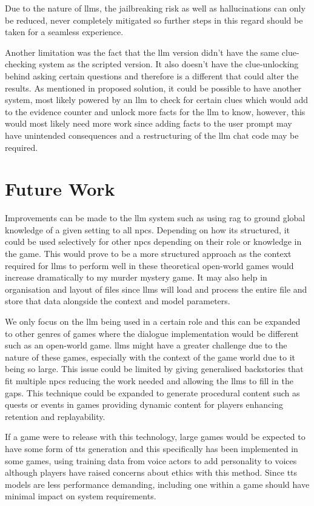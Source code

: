 \documentclass[12pt, a4paper]{report}
\begin{document}
	Due to the nature of \gls{llm}s, the jailbreaking risk as well as hallucinations can only be reduced, never completely mitigated so further steps in this regard should be taken for a seamless experience.
	
	Another limitation was the fact that the \gls{llm} version didn't have the same clue-checking system as the scripted version. It also doesn't have the clue-unlocking behind asking certain questions and therefore is a different that could alter the results. As mentioned in proposed solution, it could be possible to have another system, most likely powered by an \gls{llm} to check for certain clues which would add to the evidence counter and unlock more facts for the \gls{llm} to know, however, this would most likely need more work since adding facts to the user prompt may have unintended consequences and a restructuring of the \gls{llm} chat code may be required.
	
	\section{Future Work}
	Improvements can be made to the \gls{llm} system such as using  \gls{rag} to ground global knowledge of a given setting to all \gls{npc}s. Depending on how its structured, it could be used selectively for other \gls{npc}s depending on their role or knowledge in the game. This would prove to be a more structured approach as the context required for \gls{llm}s to perform well in these theoretical open-world games would increase dramatically to my murder mystery game. It may also help in organisation and layout of files since \gls{llm}s will load and process the entire file and store that data alongside the context and model parameters.

	We only focus on the \gls{llm} being used in a certain role and this can be expanded to other genres of games where the dialogue implementation would be different such as an open-world game. \gls{llm}s might have a greater challenge due to the nature of these games, especially with the context of the game world due to it being so large. This issue could be limited by giving generalised backstories that fit multiple \gls{npc}s reducing the work needed and allowing the \gls{llm}s to fill in the gaps. This technique could be expanded to generate procedural content such as quests or events in games providing dynamic content for players enhancing retention and replayability.
	
	If a game were to release with this technology, large games would be expected to have some form of \gls{tts} generation and this specifically has been implemented in some games, using training data from voice actors to add personality to voices although players have raised concerns about ethics with this method. Since \gls{tts} models are less performance demanding, including one within a game should have minimal impact on system requirements.
	
\end{document}
